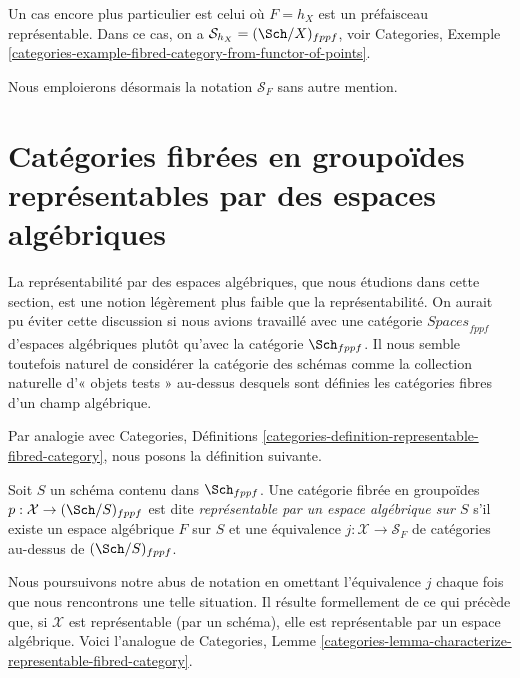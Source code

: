 \medskip\noindent
Un cas encore plus particulier est celui où $F = h_X$ est un préfaisceau
représentable. Dans ce cas, on a
$\mathcal{S}_{h_X} = (\Sch/X)_{fppf}$, voir
Categories,
Exemple \ref{categories-example-fibred-category-from-functor-of-points}.

\medskip\noindent
Nous emploierons désormais la notation $\mathcal{S}_F$ sans autre mention.





\section{Catégories fibrées en groupoïdes représentables par des espaces algébriques}
\label{section-representable-by-algebraic-spaces}

\noindent
La représentabilité par des espaces algébriques, que nous étudions dans cette section,
est une notion légèrement plus faible que la représentabilité.
On aurait pu éviter cette discussion si nous avions travaillé avec une catégorie
$\textit{Spaces}_{fppf}$ d'espaces algébriques plutôt qu'avec la catégorie
$\Sch_{fppf}$. Il nous semble toutefois naturel de considérer la
catégorie des schémas comme la collection naturelle d'« objets tests » au-dessus
desquels sont définies les catégories fibres d'un champ algébrique.

\medskip\noindent
Par analogie avec Categories, Définitions
\ref{categories-definition-representable-fibred-category},
nous posons la définition suivante.

\begin{definition}
\label{definition-representable-by-algebraic-space}
Soit $S$ un schéma contenu dans $\Sch_{fppf}$.
Une catégorie fibrée en groupoïdes $p : \mathcal{X} \to (\Sch/S)_{fppf}$
est dite {\it représentable par un espace algébrique sur $S$}
s'il existe un espace algébrique $F$ sur $S$ et une équivalence
$j : \mathcal{X} \to \mathcal{S}_F$
de catégories au-dessus de $(\Sch/S)_{fppf}$.
\end{definition}

\noindent
Nous poursuivons notre abus de notation en omettant l'équivalence $j$
chaque fois que nous rencontrons une telle situation.
Il résulte formellement de ce qui précède que, si $\mathcal{X}$ est
représentable (par un schéma), elle est représentable par un
espace algébrique. Voici l'analogue de
Categories,
Lemme \ref{categories-lemma-characterize-representable-fibred-category}.

